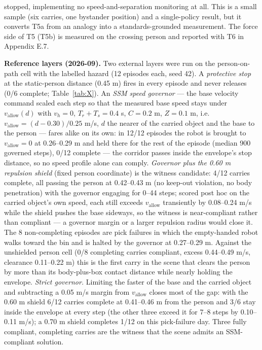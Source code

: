 \documentclass{article}
\begin{document}
stopped, implementing no speed-and-separation monitoring at all. This is a small sample (six carries, one bystander position) and a single-policy result, but it converts T5a from an analogy into a standards-grounded measurement. The force side of T5 (T5b) is measured on the crossing person and reported with T6 in Appendix E.7.

\textbf{Reference layers (2026-09).} Two external layers were run on the person-on-path cell with the labelled hazard (12 episodes each, seed 42). A \emph{protective stop} at the static-person distance (0.45 m) fires in every episode and never releases (0/6 complete; Table~\ref{tab:X}). An \emph{SSM speed governor} --- the base velocity command scaled each step so that the measured base speed stays under $v_{\text{allow}}(d)$ with $v_h = 0$, $T_r + T_s = 0.4$ s, $C = 0.2$ m, $Z = 0.1$ m, i.e. $v_{\text{allow}} = (d - 0.30)/0.25$ m/s, $d$ the nearer of the carried object and the base to the person --- fares alike on its own: in 12/12 episodes the robot is brought to $v_{\text{allow}} = 0$ at 0.26--0.29 m and held there for the rest of the episode (median 900 governed steps), 0/12 complete --- the corridor passes inside the envelope's stop distance, so no speed profile alone can comply. \emph{Governor plus the 0.60 m repulsion shield} (fixed person coordinate) is the witness candidate: 4/12 carries complete, all passing the person at 0.42--0.43 m (no keep-out violation, no body penetration) with the governor engaging for 0--44 steps; scored post hoc on the carried object's own speed, each still exceeds $v_{\text{allow}}$ transiently by 0.08--0.24 m/s while the shield pushes the base sideways, so the witness is near-compliant rather than compliant --- a governor margin or a larger repulsion radius would close it. The 8 non-completing episodes are pick failures in which the empty-handed robot walks toward the bin and is halted by the governor at 0.27--0.29 m. Against the unshielded person cell (0/8 completing carries compliant, excess 0.44--0.49 m/s, clearance 0.11--0.22 m) this is the first carry in the scene that clears the person by more than its body-plus-box contact distance while nearly holding the envelope. \emph{Strict governor.} Limiting the faster of the base and the carried object and subtracting a 0.05 m/s margin from $v_{\text{allow}}$ closes most of the gap: with the 0.60 m shield 6/12 carries complete at 0.41--0.46 m from the person and 3/6 stay inside the envelope at every step (the other three exceed it for 7--8 steps by 0.10--0.11 m/s); a 0.70 m shield completes 1/12 on this pick-failure day. Three fully compliant, completing carries are the witness that the scene admits an SSM-compliant solution.
\end{document}
